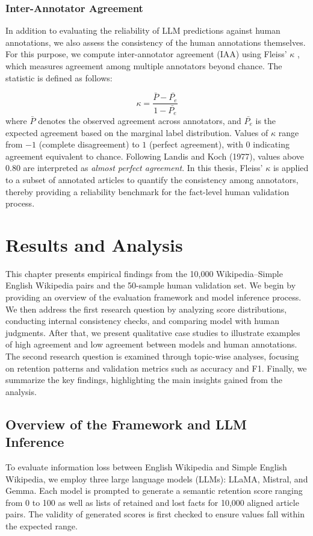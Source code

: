 \documentclass{DESSThesis}
\begin{document}
\subsection{Inter-Annotator Agreement}
\label{subsec:iaa}
In addition to evaluating the reliability of LLM predictions against human annotations, we also assess the consistency of the human annotations themselves. For this purpose, we compute inter-annotator agreement (IAA) using Fleiss' $\kappa$ \cite{fleiss1971measuring},  which measures agreement among multiple annotators beyond chance. The statistic is defined as follows:

\[
\kappa = \frac{\bar{P} - \bar{P_e}}{1 - \bar{P_e}}
\]
where $\bar{P}$ denotes the observed agreement across annotators, and $\bar{P_e}$ is the expected agreement based on the marginal label distribution. Values of $\kappa$ range from $-1$ (complete disagreement) to $1$ (perfect agreement), with $0$ indicating agreement equivalent to chance. 
Following Landis and Koch (1977), values above 0.80 are interpreted as \textit{almost perfect agreement}\cite{landis1977measurement}. 
In this thesis, Fleiss’ $\kappa$ is applied to a subset of annotated articles to quantify the consistency among annotators, thereby providing a reliability benchmark for the fact-level human validation process.

\chapter{Results and Analysis}
This chapter presents empirical findings from the 10,000 Wikipedia–Simple English Wikipedia pairs and the 50-sample human validation set. We begin by providing an overview of the evaluation framework and model inference process. We then address the first research question by analyzing score distributions, conducting internal consistency checks, and comparing model with human judgments. After that, we present qualitative case studies to illustrate examples of high agreement and low agreement between models and human annotations. The second research question is examined through topic-wise analyses, focusing on retention patterns and validation metrics such as accuracy and F1. Finally, we summarize the key findings, highlighting the main insights gained from the analysis.

\section{Overview of the Framework and LLM Inference}
To evaluate information loss between English Wikipedia and Simple English Wikipedia, we employ three large language models (LLMs): LLaMA, Mistral, and Gemma. Each model is prompted to generate a semantic retention score ranging from 0 to 100 as well as lists of retained and lost facts for 10,000 aligned article pairs. The validity of generated scores is first checked to ensure values fall within the expected range.
\end{document}
